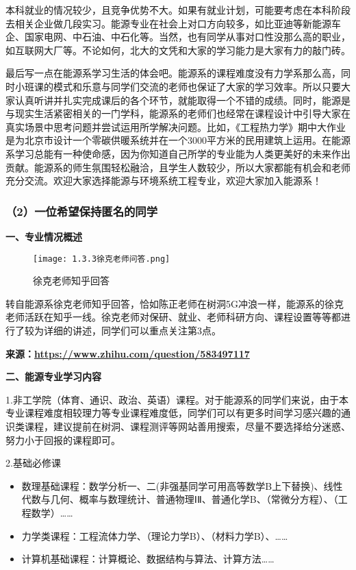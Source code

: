 \documentclass[11pt,oneside]{book}
\begin{document}
本科就业的情况较少，且竞争优势不大。如果有就业计划，可能要考虑在本科阶段去相关企业做几段实习。能源专业在社会上对口方向较多，如比亚迪等新能源车企、国家电网、中石油、中石化等。当然，也有同学从事对口性没那么高的职业，如互联网大厂等。不论如何，北大的文凭和大家的学习能力是大家有力的敲门砖。

最后写一点在能源系学习生活的体会吧。能源系的课程难度没有力学系那么高，同时小班课的模式和乐意与同学们交流的老师也保证了大家的学习效率。所以只要大家认真听讲并扎实完成课后的各个环节，就能取得一个不错的成绩。同时，能源是与现实生活紧密相关的一门学科，能源系的老师们也经常在课程设计中引导大家在真实场景中思考问题并尝试运用所学解决问题。比如，《工程热力学》期中大作业是为北京市设计一个零碳供暖系统并在一个3000平方米的民用建筑上运用。在能源系学习总能有一种使命感，因为你知道自己所学的专业能为人类更美好的未来作出贡献。能源系的师生氛围轻松融洽，且学生人数较少，所以大家都能有机会和老师充分交流。欢迎大家选择能源与环境系统工程专业，欢迎大家加入能源系！

\subsubsection{（2）一位希望保持匿名的同学}
\textbf{一、专业情况概述}

\begin{figure}[htbp]
    \centering
    \texttt{[image: 1.3.3徐克老师问答.png]}
    \renewcommand{\figurename}{图}
    \caption{徐克老师知乎回答}
    \label{fig:enter-label}
\end{figure}

转自能源系徐克老师知乎回答，恰如陈正老师在树洞5G冲浪一样，能源系的徐克老师活跃在知乎一线。徐克老师对保研、就业、老师科研方向、课程设置等等都进行了较为详细的讲述，同学们可以重点关注第3点。

\textbf{来源：}\href{https://www.zhihu.com/question/583497117}{\textbf{https://www.zhihu.com/question/583497117}}

\textbf{二、能源专业学习内容}

1.非工学院（体育、通识、政治、英语）课程。对于能源系的同学们来说，由于本专业课程难度相较理力等专业课程难度低，同学们可以有更多时间学习感兴趣的通识类课程，建议提前在树洞、课程测评等网站善用搜索，尽量不要选择给分迷惑、努力小于回报的课程即可。

2.基础必修课

\begin{itemize}
    \item 数理基础课程：数学分析一、二(非强基同学可用高等数学B上下替换)、线性代数与几何、概率与数理统计、普通物理ⅠⅡ、普通化学B、（常微分方程）、（工程数学）……

    \item 力学类课程：工程流体力学、（理论力学B）、（材料力学B）、……

    \item 计算机基础课程：计算概论、数据结构与算法、计算方法……

\end{itemize}
\end{document}
